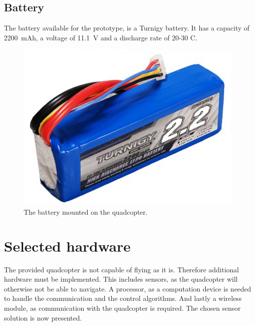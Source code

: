 \subsection{Battery}
The battery available for the prototype, is a Turnigy battery. It has a capacity of \SI{2200}{mAh}, a voltage of \SI{11.1}{V} and a discharge rate of 20-30 C.\cite{HKingBattery}
\begin{figure}[H]
	\centering
	\includegraphics[scale=0.4]{figures/BatteryPicturephoto}
	\caption{The battery mounted on the quadcopter.\cite{HKingBatterypicture}}
	\label{fig:battery}
\end{figure}
%
\newpage
\section{Selected hardware}
The provided quadcopter is not capable of flying as it is. Therefore additional hardware must be implemented. This includes sensors, as the quadcopter will otherwise not be able to navigate. A processor, as a computation device is needed to handle the communication and the control algorithms. And lastly a wireless module, as communication with the quadcopter is required. The chosen sensor solution is now presented.
